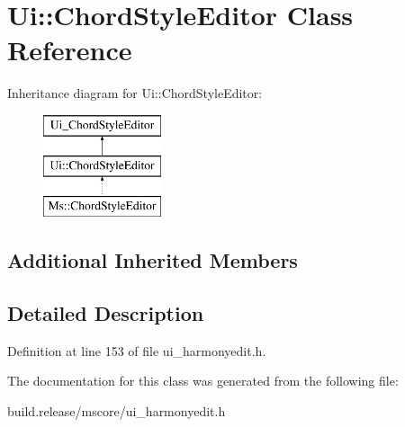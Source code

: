 \hypertarget{class_ui_1_1_chord_style_editor}{}\section{Ui\+:\+:Chord\+Style\+Editor Class Reference}
\label{class_ui_1_1_chord_style_editor}
Inheritance diagram for Ui\+:\+:Chord\+Style\+Editor\+:\begin{figure}[H]
\begin{center}
\leavevmode
\includegraphics[height=3.000000cm]{class_ui_1_1_chord_style_editor}
\end{center}
\end{figure}
\subsection*{Additional Inherited Members}


\subsection{Detailed Description}


Definition at line 153 of file ui\+\_\+harmonyedit.\+h.



The documentation for this class was generated from the following file\+:\begin{DoxyCompactItemize}
\item 
build.\+release/mscore/ui\+\_\+harmonyedit.\+h\end{DoxyCompactItemize}
